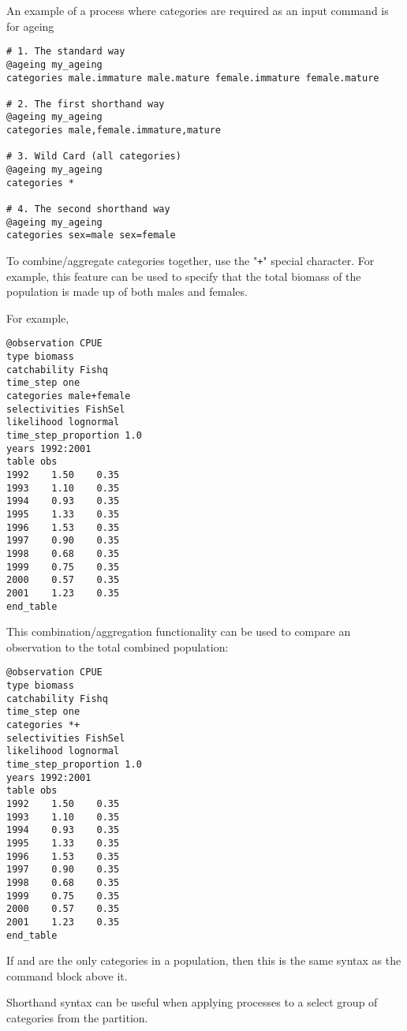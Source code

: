An example of a process where categories are required as an input command is for ageing

{\small{\begin{verbatim}
# 1. The standard way
@ageing my_ageing
categories male.immature male.mature female.immature female.mature

# 2. The first shorthand way
@ageing my_ageing
categories male,female.immature,mature

# 3. Wild Card (all categories)
@ageing my_ageing
categories *

# 4. The second shorthand way
@ageing my_ageing
categories sex=male sex=female
\end{verbatim}}}

To combine/aggregate categories together, use the "\texttt{+}" special character. For example, this feature can be used to specify that the total biomass of the population is made up of both males and females.

For example,

{\small{\begin{verbatim}
@observation CPUE
type biomass
catchability Fishq
time_step one
categories male+female
selectivities FishSel
likelihood lognormal
time_step_proportion 1.0
years 1992:2001
table obs
1992    1.50    0.35
1993    1.10    0.35
1994    0.93    0.35
1995    1.33    0.35
1996    1.53    0.35
1997    0.90    0.35
1998    0.68    0.35
1999    0.75    0.35
2000    0.57    0.35
2001    1.23    0.35
end_table
\end{verbatim}}}

This combination/aggregation functionality can be used to compare an observation to the total combined population:

{\small{\begin{verbatim}
@observation CPUE
type biomass
catchability Fishq
time_step one
categories *+
selectivities FishSel
likelihood lognormal
time_step_proportion 1.0
years 1992:2001
table obs
1992    1.50    0.35
1993    1.10    0.35
1994    0.93    0.35
1995    1.33    0.35
1996    1.53    0.35
1997    0.90    0.35
1998    0.68    0.35
1999    0.75    0.35
2000    0.57    0.35
2001    1.23    0.35
end_table
\end{verbatim}}}

If  and  are the only categories in a population, then this is the same syntax as the command block above it.

Shorthand syntax can be useful when applying processes to a select group of categories from the partition.

